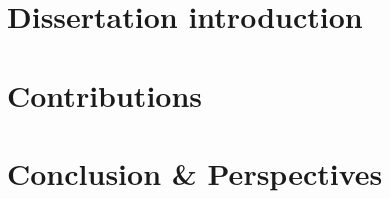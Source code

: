 \documentclass[english]{spimumlpphdthesis}
\begin{document}
 






\tableofcontents



\mainmatter 



 
\part{Dissertation introduction}




% 




\part{Contributions}




\part{Conclusion \& Perspectives}




\backmatter
 
 
 
 
 
\end{document}
